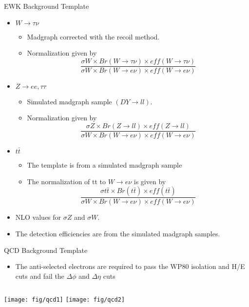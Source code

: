 \documentclass[8pt]{beamer}
\begin{document}
\begin{frame}{EWK Background Template}
  \begin{itemize}
    \item $W \to \tau \nu$
    \begin{itemize}
      \item Madgraph corrected with the recoil method. 
      \item Normalization given by 
      \begin{equation}
      \frac { \sigma W \times Br(W\to\tau\nu) \times eff(W\to\tau\nu)}
      { \sigma W \times Br(W\to e \nu) \times eff(W\to e\nu)}
      \end{equation}
    \end{itemize}
    \item $Z \to ee, \tau \tau$
    \begin{itemize}
      \item Simulated madgraph sample $(DY \to ll)$.
      \item Normalization given by %
      \begin{equation}
      \frac { \sigma Z \times Br(Z\to ll) \times eff(Z\to ll)}
      { \sigma W \times Br(W\to e \nu) \times eff(W\to e\nu)}
      \end{equation}
    \end{itemize}
    \item $t\bar t$
    \begin{itemize}
      \item The template is from a simulated madgraph sample
      \item The normalization of tt to $W\to e \nu$ is given by %
      \begin{equation}
      \frac { \sigma t\bar t \times Br(t\bar t) \times eff(t\bar t)}
      { \sigma W \times Br(W\to e \nu) \times eff(W\to e\nu)}
      \end{equation}
    \end{itemize}
    \item NLO values for $\sigma Z$ and $\sigma W$. 
    \item The detection efficiencies are from the simulated madgraph samples.
  \end{itemize}
\end{frame}


\begin{frame}{QCD Background Template}
  \begin{itemize}
    \item The anti-selected electrons are required to pass the WP80 isolation
    and H/E cuts and fail the $\Delta \phi$ and $\Delta \eta$ cuts
  \end{itemize}
  \begin{columns}[c]
    \texttt{[image: fig/qcd1]}
    \texttt{[image: fig/qcd2]}
  \end{columns}
\end{frame}
\end{document}
